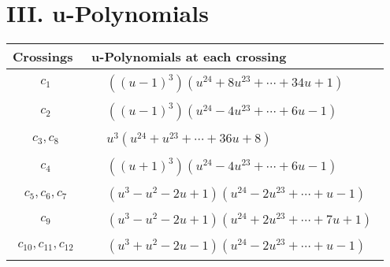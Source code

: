 \documentclass[1p]{elsarticle_modified}
\theoremstyle{definition}
\begin{document}
\newpage\renewcommand{\arraystretch}{1}
\centering \section*{ III. u-Polynomials}
\begin{tabular}{m{50pt}|m{274pt}}
Crossings & \hspace{64pt}u-Polynomials at each crossing \\
\hline $$\begin{aligned}c_{1}\end{aligned}$$&$\begin{aligned}
&((u-1)^3)(u^{24}+8 u^{23}+\cdots+34 u+1)
\end{aligned}$\\
\hline $$\begin{aligned}c_{2}\end{aligned}$$&$\begin{aligned}
&((u-1)^3)(u^{24}-4 u^{23}+\cdots+6 u-1)
\end{aligned}$\\
\hline $$\begin{aligned}c_{3},c_{8}\end{aligned}$$&$\begin{aligned}
&u^3(u^{24}+u^{23}+\cdots+36 u+8)
\end{aligned}$\\
\hline $$\begin{aligned}c_{4}\end{aligned}$$&$\begin{aligned}
&((u+1)^3)(u^{24}-4 u^{23}+\cdots+6 u-1)
\end{aligned}$\\
\hline $$\begin{aligned}c_{5},c_{6},c_{7}\end{aligned}$$&$\begin{aligned}
&(u^3- u^2-2 u+1)(u^{24}-2 u^{23}+\cdots+u-1)
\end{aligned}$\\
\hline $$\begin{aligned}c_{9}\end{aligned}$$&$\begin{aligned}
&(u^3- u^2-2 u+1)(u^{24}+2 u^{23}+\cdots+7 u+1)
\end{aligned}$\\
\hline $$\begin{aligned}c_{10},c_{11},c_{12}\end{aligned}$$&$\begin{aligned}
&(u^3+u^2-2 u-1)(u^{24}-2 u^{23}+\cdots+u-1)
\end{aligned}$\\
\hline
\end{tabular}\newpage\renewcommand{\arraystretch}{1}
\end{document}

